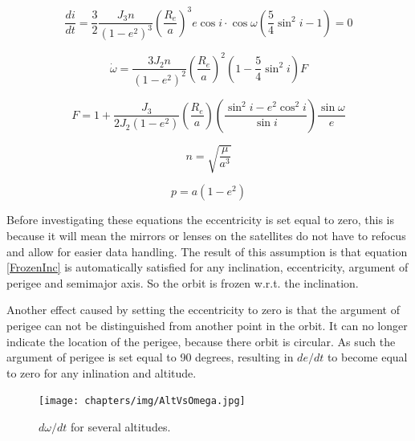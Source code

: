 \documentclass{article}
\begin{document}
\begin{equation}
\frac{{di}}
{{dt}} = \frac{3}
{2}\frac{{J_3 n}}
{{\left( {1 - e^2 } \right)^3 }}\left( {\frac{{R_e }}
{a}} \right)^3 e\cos i \cdot \cos \omega \left( {\frac{5}
{4}\sin ^2 i - 1} \right) = 0
\label{FrozenInc}
\end{equation}

\begin{equation}
\dot \omega  = \frac{{3J_2 n}}
{{\left( {1 - e^2 } \right)^2 }}\left( {\frac{{R_e }}
{a}} \right)^2 \left( {1 - \frac{5}
{4}\sin ^2 i} \right)F
\label{FrozenArg}
\end{equation}

\begin{equation}
F = 1 + \frac{{J_3 }}
{{2J_2 \left( {1 - e^2 } \right)}}\left( {\frac{{R_e }}
{a}} \right)\left( {\frac{{\sin ^2 i - e^2 \cos ^2 i}}
{{\sin i}}} \right)\frac{{\sin \omega }}
{e}
\label{FrozenF}
\end{equation}

\begin{equation}
n = \sqrt {\frac{\mu }
{{a^3 }}} 
\label{meanMotion}
\end{equation}

\begin{equation}
p = a\left( {1 - e^2 } \right)
\label{p}
\end{equation}

Before investigating these equations the eccentricity is set equal to zero, this is because it will mean the mirrors or lenses on the satellites do not have to refocus and allow for easier data handling.
The result of this assumption is that equation \ref{FrozenInc} is automatically satisfied for any inclination, eccentricity, argument of perigee and semimajor axis. So the orbit is frozen w.r.t. the inclination.

Another effect caused by setting the eccentricity to zero is that the argument of perigee can not be distinguished from another point in the orbit. It can no longer indicate the location of the perigee, because there orbit is circular. As such the argument of perigee is set equal to 90 degrees, resulting in $de/dt$ to become equal to zero for any inlination and altitude.

\begin{figure}
\centering
\texttt{[image: chapters/img/AltVsOmega.jpg]}
\label{fig:AltVsOmega}
\caption{$d\omega/dt$ for several altitudes.}
\end{figure}
\end{document}
